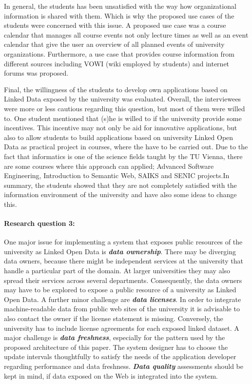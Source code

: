 \documentclass{article}
\begin{document}
In general, the students has been unsatisfied with the way how organizational information is shared with them. Which is why the proposed use cases of the students were concerned with this issue. A proposed use case was a course calendar that manages all course events not only lecture times as well as an event calendar that give the user an overview of all planned events of university organizations. Furthermore, a use case that provides course information from different sources including VOWI (wiki employed by students) and internet forums was proposed.

Final, the willingness of the students to develop own applications based on Linked Data exposed by the university was evaluated. Overall, the interviewees were more or less cautious regarding this question, but most of them were willed to. One student mentioned that (s)he is willed to if the university provide some incentives. This incentive may not only be aid for innovative applications, but also to allow students to build applications based on university Linked Open Data as practical project in courses, where the have to be carried out. Due to the fact that informatics is one of the science fields taught by the TU Vienna, there are some courses where this approach can applied; Advanced Software Engineering, Introduction to Semantic Web, SAIKS and SENIC projects.In summary, the students showed that they are not completely satisfied with the information environment of the university and have also some ideas to change this.

\paragraph{Research question 3:} One major issue for implementing a system that exposes public resources of the university as Linked Open Data is \textbf{\textit{data ownership}}. There may be diverging data owners, because there might be independent services at the university that handle a particular part of the domain. At larger universities they may also spread their services across several departments. Consequently, the data owners may have to be explored to expose a public resource of a university as Linked Open Data. A further minor challenge are \textbf{\textit{data licenses}}. In order to integrate machine-readable data from public web sites of the university it is advisable to also contact the owner if the license statement is missing. Conversely, the university has to include license agreements for each exposed linked dataset. A major challenge is \textbf{\textit{data freshness}}, especially for the pattern used by the proposed architecture of this paper. The system designer has to choose the update intervals thoughtfully to satisfy the needs of the application developer regarding performance and data freshness. \textit{\textbf{Data quality}} assessments should be kept in mind, if data exposed on the Web is integrated into the system.
\end{document}
